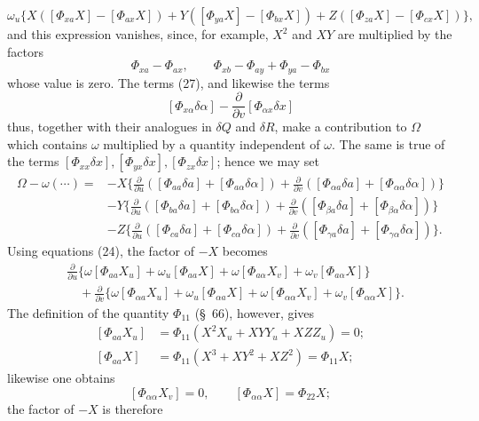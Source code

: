 \documentclass[11pt,a4paper,leqno]{article}
\begin{document}
\[
\omega_u\{X([\Phi_{xa}X]-[\Phi_{ax}X])
+Y([\Phi_{ya}X]-[\Phi_{bx}X])
+Z([\Phi_{za}X]-[\Phi_{cx}X])\},
\]
and this expression vanishes, since, for example, $X^2$ and $XY$ are
multiplied by the factors
\[
\Phi_{xa}-\Phi_{ax},\qquad
\Phi_{xb}-\Phi_{ay}+\Phi_{ya}-\Phi_{bx}
\]
whose value is zero. The terms (27), and likewise the terms
\[
[\Phi_{x\alpha}\delta\alpha]
-\frac{\partial}{\partial v}[\Phi_{\alpha x}\delta x]
\]
thus, together with their analogues in $\delta Q$ and $\delta R$, make a
contribution to $\Omega$ which contains $\omega$ multiplied by a quantity
independent of $\omega$. The same is true of the terms
$[\Phi_{xx}\delta x],[\Phi_{yx}\delta x],[\Phi_{zx}\delta x]$; hence we
may set
\[
\begin{aligned}
\Omega-\omega(\cdots)={}&-X\Biggl\{
\frac{\partial}{\partial u}([\Phi_{aa}\delta a]+[\Phi_{a\alpha}\delta\alpha])
+\frac{\partial}{\partial v}([\Phi_{\alpha a}\delta a]+[\Phi_{\alpha\alpha}\delta\alpha])\Biggr\}\\
&-Y\Biggl\{
\frac{\partial}{\partial u}([\Phi_{ba}\delta a]+[\Phi_{b\alpha}\delta\alpha])
+\frac{\partial}{\partial v}([\Phi_{\beta a}\delta a]+[\Phi_{\beta\alpha}\delta\alpha])\Biggr\}\\
&-Z\Biggl\{
\frac{\partial}{\partial u}([\Phi_{ca}\delta a]+[\Phi_{c\alpha}\delta\alpha])
+\frac{\partial}{\partial v}([\Phi_{\gamma a}\delta a]+[\Phi_{\gamma\alpha}\delta\alpha])\Biggr\}.
\end{aligned}
\]
Using equations (24), the factor of $-X$ becomes
\[
\begin{aligned}
&\frac{\partial}{\partial u}\{\omega[\Phi_{aa}X_u]
+\omega_u[\Phi_{aa}X]+\omega[\Phi_{a\alpha}X_v]
+\omega_v[\Phi_{a\alpha}X]\}\\
&\quad+\frac{\partial}{\partial v}\{\omega[\Phi_{\alpha a}X_u]
+\omega_u[\Phi_{\alpha a}X]+\omega[\Phi_{\alpha\alpha}X_v]
+\omega_v[\Phi_{\alpha\alpha}X]\}.
\end{aligned}
\]
The definition of the quantity $\Phi_{11}$ (\S~66), however, gives
\[
\begin{aligned}
[\Phi_{aa}X_u]&=\Phi_{11}(X^2X_u+XYY_u+XZZ_u)=0;\\
[\Phi_{aa}X]&=\Phi_{11}(X^3+XY^2+XZ^2)=\Phi_{11}X;
\end{aligned}
\]
likewise one obtains
\[
[\Phi_{\alpha\alpha}X_v]=0,\qquad
[\Phi_{\alpha\alpha}X]=\Phi_{22}X;
\]
the factor of $-X$ is therefore
\end{document}
